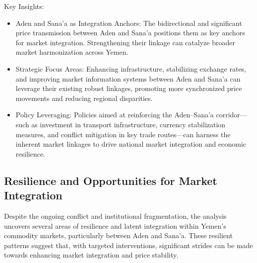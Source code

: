 Key Insights:
\begin{itemize}
\item Aden and Sana'a as Integration Anchors: The bidirectional and significant price transmission between Aden and Sana'a positions them as key anchors for market integration. Strengthening their linkage can catalyze broader market harmonization across Yemen.
  
\item Strategic Focus Areas: Enhancing infrastructure, stabilizing exchange rates, and improving market information systems between Aden and Sana'a can leverage their existing robust linkages, promoting more synchronized price movements and reducing regional disparities.
  
\item Policy Leveraging: Policies aimed at reinforcing the Aden–Sana'a corridor—such as investment in transport infrastructure, currency stabilization measures, and conflict mitigation in key trade routes—can harness the inherent market linkages to drive national market integration and economic resilience.
\end{itemize}

\subsection{Resilience and Opportunities for Market Integration}

Despite the ongoing conflict and institutional fragmentation, the analysis uncovers several areas of resilience and latent integration within Yemen's commodity markets, particularly between Aden and Sana'a. These resilient patterns suggest that, with targeted interventions, significant strides can be made towards enhancing market integration and price stability.


